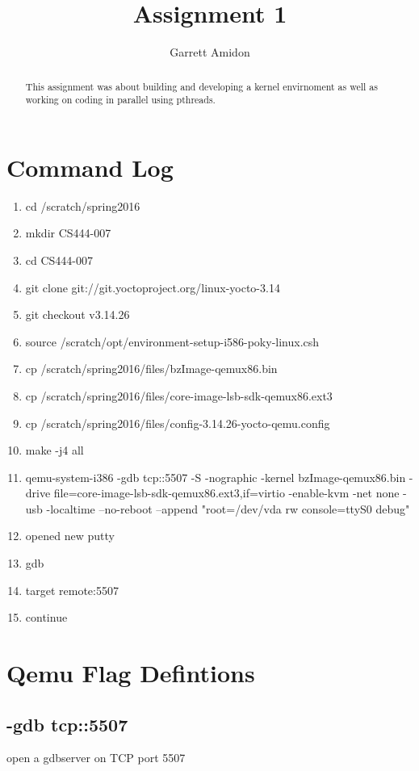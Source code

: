 \documentclass[letterpaper,10pt,titlepage,draftclsnofoot,onecolumn]{IEEEtran}
\title{Assignment 1}
\author{Garrett Amidon}
\begin{document}
\begin{titlingpage}
    \maketitle
	\centering{}
    \begin{abstract}
        This assignment was about building and developing a kernel envirnoment as well as working on coding in parallel using pthreads. 
    \end{abstract}
\end{titlingpage}
\section{Command Log}
\begin{enumerate}
\item cd /scratch/spring2016
\item mkdir CS444-007
\item cd CS444-007
\item git clone git://git.yoctoproject.org/linux-yocto-3.14
\item git checkout v3.14.26
\item source /scratch/opt/environment-setup-i586-poky-linux.csh
\item cp /scratch/spring2016/files/bzImage-qemux86.bin
\item cp /scratch/spring2016/files/core-image-lsb-sdk-qemux86.ext3 
\item cp /scratch/spring2016/files/config-3.14.26-yocto-qemu.config
\item make -j4 all
\item qemu-system-i386 -gdb tcp::5507 -S -nographic -kernel bzImage-qemux86.bin -drive file=core-image-lsb-sdk-qemux86.ext3,if=virtio -enable-kvm -net none -usb -localtime --no-reboot --append "root=/dev/vda rw console=ttyS0 debug"
\item opened new putty
\item gdb
\item target remote:5507
\item continue
\end{enumerate}
\section{Qemu Flag Defintions}
\subsection{-gdb tcp::5507}
open a gdbserver on TCP port 5507
\end{document}
